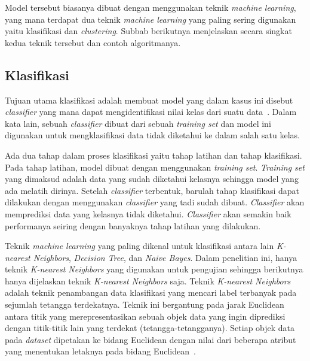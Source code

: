 Model tersebut biasanya dibuat dengan menggunakan teknik \textit{machine learning}, yang mana terdapat dua teknik \textit{machine learning} yang paling sering digunakan yaitu klasifikasi dan \textit{clustering}. Subbab berikutnya menjelaskan secara singkat kedua teknik tersebut dan contoh algoritmanya.

\subsection{Klasifikasi}
\label{subsec:klasifikasi}

Tujuan utama klasifikasi adalah membuat model yang dalam kasus ini disebut \textit{classifier} yang mana dapat mengidentifikasi nilai kelas dari suatu data~\cite{mendes:17:ppdmieee}. Dalam kata lain, sebuah \textit{classifier} dibuat dari sebuah \textit{training set} dan model ini digunakan untuk mengklasifikasi data tidak diketahui ke dalam salah satu kelas.

Ada dua tahap dalam proses klasifikasi yaitu tahap latihan dan tahap klasifikasi. Pada tahap latihan, model dibuat dengan menggunakan \textit{training set}. \textit{Training set} yang dimaksud adalah data yang sudah diketahui kelasnya sehingga model yang ada melatih dirinya. Setelah \textit{classifier} terbentuk, barulah tahap klasifikasi dapat dilakukan dengan menggunakan \textit{classifier} yang tadi sudah dibuat. \textit{Classifier} akan memprediksi data yang kelasnya tidak diketahui. \textit{Classifier} akan semakin baik performanya seiring dengan banyaknya tahap latihan yang dilakukan.

Teknik \textit{machine learning} yang paling dikenal untuk klasifikasi antara lain \textit{K-nearest Neighbors}, \textit{Decision Tree}, dan \textit{Naive Bayes}. Dalam penelitian ini, hanya teknik \textit{K-nearest Neighbors} yang digunakan untuk pengujian sehingga berikutnya hanya dijelaskan teknik \textit{K-nearest Neighbors} saja. Teknik \textit{K-nearest Neighbors} adalah teknik penambangan data klasifikasi yang mencari label terbanyak pada sejumlah tetangga terdekatnya. Teknik ini bergantung pada jarak Euclidean antara titik yang merepresentasikan sebuah objek data yang ingin diprediksi dengan titik-titik lain yang terdekat (tetangga-tetangganya). Setiap objek data pada \textit{dataset} dipetakan ke bidang Euclidean dengan nilai dari beberapa atribut yang menentukan letaknya pada bidang Euclidean~\cite{jiawei:12:datmin}.

